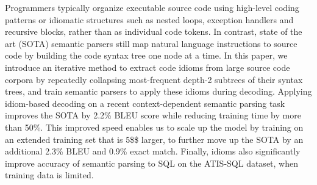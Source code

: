 Programmers typically organize executable source code using high-level coding patterns or idiomatic structures such as nested loops, exception handlers and recursive blocks, rather than as individual code tokens. In contrast, state of the art (SOTA) semantic parsers still map natural language instructions to source code by building the code syntax tree one node at a time. In this paper, we introduce an iterative method to extract code idioms from large source code corpora by repeatedly collapsing most-frequent depth-2 subtrees of their syntax trees, and train semantic parsers to apply these idioms during decoding. Applying idiom-based decoding on a recent context-dependent semantic parsing task improves the SOTA by 2.2\% BLEU score while reducing training time by more than 50\%. This improved speed enables us to scale up the model by training on an extended training set that is 5\$\times\$ larger, to further move up the SOTA by an additional 2.3\% BLEU and 0.9\% exact match. Finally, idioms also significantly improve accuracy of semantic parsing to SQL on the ATIS-SQL dataset, when training data is limited.
